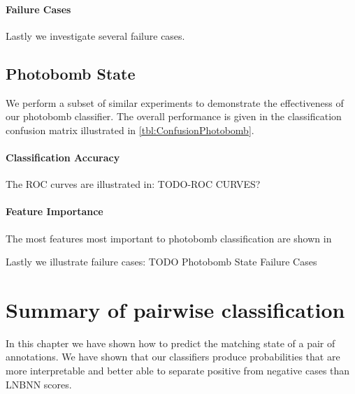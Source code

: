         \MatchWordCloud{}
        \ImportantMatchFeat{}

        \paragraph{Failure Cases}
        Lastly we investigate several failure cases.

        \PairFailIN{} 

        \PairFailNP{}

        \PairFailPN{}


    \subsection{Photobomb State}
        We perform a subset of similar experiments to demonstrate the effectiveness of
        our photobomb classifier.
        The overall performance is given in the classification confusion matrix
        illustrated in \cref{tbl:ConfusionPhotobomb}.

        \ConfusionPhotobomb{}

        \EvalMetricsPhotobomb{}


        \paragraph{Classification Accuracy}
        The ROC curves are illustrated in: TODO-ROC CURVES?

        \paragraph{Feature Importance}
        The most features most important to photobomb classification are shown in

        \ImportantPBFeat{}

        Lastly we illustrate failure cases: TODO Photobomb State Failure Cases


\section{Summary of pairwise classification}

    In this chapter we have shown how to predict the matching state of a pair of annotations. 
    We have shown that our classifiers produce probabilities that are more
    interpretable and better able to separate positive from negative cases than
    LNBNN scores. 
